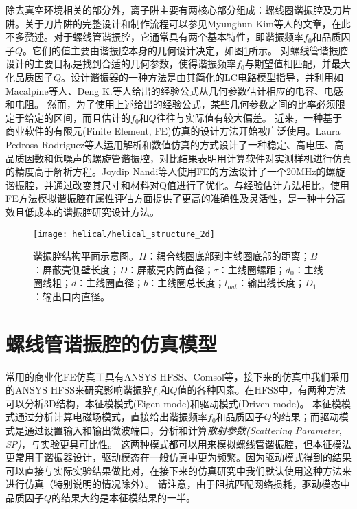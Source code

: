除去真空环境相关的部分外，离子阱主要有两核心部分组成：螺线圈谐振腔及刀片阱。关于刀片阱的完整设计和制作流程可以参见Myunghun Kim等人\cite[]{Kim_Kim_Hong_Lee_Moon_Lee_Kim_Ha_Sim_Lee_2022}的文章，在此不多赘述。对于螺线管谐振腔，它通常具有两个基本特性，即谐振频率$f_0$和品质因子$Q$。它们的值主要由谐振腔本身的几何设计决定，如图\ref{fig:helical_structure_2d}所示。
对螺线管谐振腔设计的主要目标是找到合适的几何参数，使得谐振频率$f_0$与期望值相匹配，并最大化品质因子$Q$。设计谐振器的一种方法是由其简化的LC电路模型指导，并利用如Macalpine等人\cite[]{Macalpine_Schildknecht_1959}、Deng K.等人\cite[]{Deng_Sun_Yuan_Xu_Zhang_Lu_Luo_2014}给出的经验公式从几何参数估计相应的电容、电感和电阻。
然而，为了使用上述给出的经验公式，某些几何参数之间的比率必须限定于给定的区间，而且估计的$f_0$和$Q$往往与实际值有较大偏差。
近来，一种基于商业软件的有限元(Finite Element, FE)仿真的设计方法开始被广泛使用。Laura Pedrosa-Rodriguez等人\cite[]{Pedrosa_Rodriguez_Outerelo_Gomez_Alcala_de_Vicente_Diaz_Otero_2018}运用解析和数值仿真的方式设计了一种稳定、高电压、高品质因数和低噪声的螺旋管谐振腔，对比结果表明用计算软件对实测样机进行仿真的精度高于解析方程。Joydip Nandi等人\cite[]{Nandi_Sikdar_Reza_Misra_Das_Ray_2020}使用FE的方法设计了一个20MHz的螺旋谐振腔，并通过改变其尺寸和材料对Q值进行了优化。与经验估计方法相比，使用FE方法模拟谐振腔在属性评估方面提供了更高的准确性及灵活性，是一种十分高效且低成本的谐振腔研究设计方法。

\begin{figure}
    \centering
    \caption[谐振腔结构平面示意图]{谐振腔结构平面示意图。$H$：耦合线圈底部到主线圈底部的距离；$B$：屏蔽壳侧壁长度；$D$：屏蔽壳内筒直径；$\tau$：主线圈螺距；$d_0$：主线圈线粗；$d$：主线圈直径；$b$：主线圈总长度；$l_{out}$：输出线长度；$D_1$：输出口内直径。\label{fig:helical_structure_2d}}
    \texttt{[image: helical/helical\_structure\_2d]}
\end{figure}

\section[螺线管谐振腔的仿真模型]{螺线管谐振腔的仿真模型}

常用的商业化FE仿真工具有ANSYS HFSS、Comsol等，接下来的仿真中我们采用的ANSYS HFSS来研究影响谐振腔$f_0$和$Q$值的各种因素。在HFSS中，有两种方法可以分析3D结构，本征模模式(Eigen-mode)和驱动模式(Driven-mode)。
本征模模式通过分析计算电磁场模式，直接给出谐振频率$f_0$和品质因子$Q$的结果；而驱动模式是通过设置输入和输出微波端口，分析和计算\emph{散射参数(Scattering Parameter, SP)}，与实验更具可比性。
这两种模式都可以用来模拟螺线管谐振腔，但本征模法更常用于谐振器设计，驱动模态在一般仿真中更为频繁。因为驱动模式得到的结果可以直接与实际实验结果做比对，在接下来的仿真研究中我们默认使用这种方法来进行仿真（特别说明的情况除外）。
请注意，由于阻抗匹配网络损耗\cite[]{Gandolfi_Niedermayr_Kumph_Brownnutt_Blatt_2012}，驱动模态中品质因子$Q$的结果大约是本征模结果的一半。


